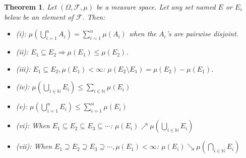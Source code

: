 \documentclass[12pt, a4paper]{article}
\newtheorem{theorem}{Theorem}[section]
\numberwithin{equation}{section}
\begin{document}
\begin{theorem}
\label{measure_properties}
Let $(\Omega, \mathcal{F}, \mu)$ be a measure space. Let any set named $E$ or $E_i$ below be an element of $\mathcal{F}$. Then:
\begin{itemize}
\item (i): $\mu\left(\bigcup_{i=1}^n A_i\right)=\sum_{i=1}^n\mu(A_i)$ when the $A_i$'s are pairwise disjoint.
\item (ii): $E_1\subseteq E_2\Rightarrow\mu(E_1)\le\mu(E_2)$.
\item (iii): $E_1\subseteq E_2,\mu(E_1)<\infty$: $\mu(E_2\setminus E_1)=\mu(E_2)-\mu(E_1)$.
\item (iv): $\mu\left(\bigcup_{i\in\mathbb{N}}E_i\right)\le\sum_{i\in\mathbb{N}}\mu(E_i)$
\item (v): $\mu\left(\bigcup_{i=1}^n E_i\right)\le\sum_{i=1}^n\mu(E_i)$
\item (vi): When $E_1\subseteq E_2\subseteq E_3\subseteq\cdots$: $\mu(E_i)\nearrow\mu\left(\bigcup_{i\in\mathbb{N}}E_i\right)$
\item (vii): When $E_1\supseteq E_2\supseteq E_3\supseteq\cdots, \mu(E_1)<\infty$: $\mu(E_i)\searrow\mu\left(\bigcap_{i\in\mathbb{N}}E_i\right)$
\end{itemize}
\end{theorem}
\end{document}
